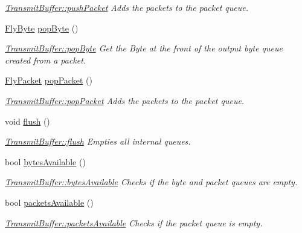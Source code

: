 \begin{DoxyCompactItemize}
\begin{DoxyCompactList}\small\item\em \hyperlink{class_transmit_buffer_a002757b58f4227167db20c8977bbdb28}{Transmit\+Buffer\+::push\+Packet} Adds the packets to the packet queue. \end{DoxyCompactList}\item 
\hyperlink{conversions_8h_a1f006e31a957accfe6aa1bf6f401efce}{Fly\+Byte} \hyperlink{class_transmit_buffer_a6da9417079dd783d996af8fcc138149c}{pop\+Byte} ()
\begin{DoxyCompactList}\small\item\em \hyperlink{class_transmit_buffer_a6da9417079dd783d996af8fcc138149c}{Transmit\+Buffer\+::pop\+Byte} Get the Byte at the front of the output byte queue created from a packet. \end{DoxyCompactList}\item 
\hyperlink{class_fly_packet}{Fly\+Packet} \hyperlink{class_transmit_buffer_add84c61a7f2f060d236feab584babc64}{pop\+Packet} ()
\begin{DoxyCompactList}\small\item\em \hyperlink{class_transmit_buffer_add84c61a7f2f060d236feab584babc64}{Transmit\+Buffer\+::pop\+Packet} Adds the packets to the packet queue. \end{DoxyCompactList}\item 
void \hyperlink{class_transmit_buffer_a574f5ab5eca07b5ee8a517812cd7d87a}{flush} ()
\begin{DoxyCompactList}\small\item\em \hyperlink{class_transmit_buffer_a574f5ab5eca07b5ee8a517812cd7d87a}{Transmit\+Buffer\+::flush} Empties all internal queues. \end{DoxyCompactList}\item 
bool \hyperlink{class_transmit_buffer_aec08c2e6aa511bfd87d83ec4226b2c8e}{bytes\+Available} ()
\begin{DoxyCompactList}\small\item\em \hyperlink{class_transmit_buffer_aec08c2e6aa511bfd87d83ec4226b2c8e}{Transmit\+Buffer\+::bytes\+Available} Checks if the byte and packet queues are empty. \end{DoxyCompactList}\item 
bool \hyperlink{class_transmit_buffer_aad9976b2ae40b1405a319de979b09827}{packets\+Available} ()
\begin{DoxyCompactList}\small\item\em \hyperlink{class_transmit_buffer_aad9976b2ae40b1405a319de979b09827}{Transmit\+Buffer\+::packets\+Available} Checks if the packet queue is empty. \end{DoxyCompactList}\end{DoxyCompactItemize}



